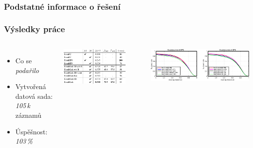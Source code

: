 \documentclass[]{fitthesispresn}
\begin{document}
    \begin{frame}\frametitle{Podstatné informace o řešení}
    \end{frame}

    \begin{frame}
        \frametitle{Výsledky práce}
        \begin{columns}
            \begin{itemize}
                \item Co se \emph{podařilo}
                \item Vytvořená datová sada: \emph{105\,k} záznamů
                \item Úspěšnost: \emph{103\,\%}
            \end{itemize}

            \centering
            \includegraphics[width=0.8\textwidth]{img/template-ResultsTable.pdf}

            \bigskip
            \includegraphics[width=\textwidth]{img/template-ResultsPlot.pdf}

        \end{columns}
    \end{frame}
\end{document}

